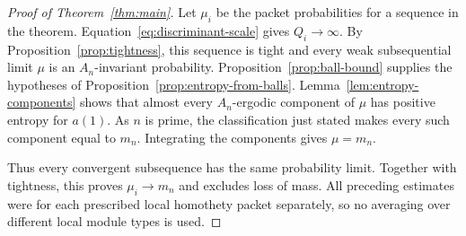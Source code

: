 \begin{proof}[Proof of Theorem~\ref{thm:main}]
Let $\mu_i$ be the packet probabilities for a sequence in the theorem.
Equation~\eqref{eq:discriminant-scale} gives $Q_i\to\infty$.
By Proposition~\ref{prop:tightness}, this sequence is tight and every
weak subsequential limit $\mu$ is an $A_n$-invariant probability.
Proposition~\ref{prop:ball-bound} supplies the hypotheses of
Proposition~\ref{prop:entropy-from-balls}.
Lemma~\ref{lem:entropy-components} shows that almost every
$A_n$-ergodic component of $\mu$ has positive entropy for $a(1)$.
As $n$ is prime, the classification just stated makes every such
component equal to $m_n$.  Integrating the components gives $\mu=m_n$.

Thus every convergent subsequence has the same probability limit.
Together with tightness, this proves $\mu_i\to m_n$ and excludes
loss of mass.  All preceding estimates were for each prescribed local
homothety packet separately, so no averaging over different local
module types is used.
\end{proof}
